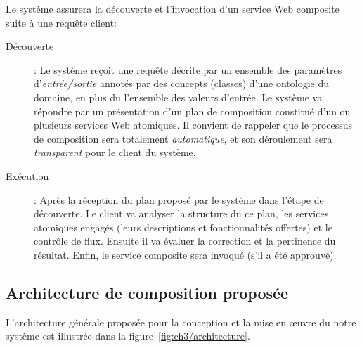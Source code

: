 Le système assurera la découverte et l'invocation d'un service Web
composite suite à une requête client:\medskip

\renewcommand{\descriptionlabel}[1]{\hspace{0.5cm}\textbullet~\textsf{#1}}
\begin{description}
\item [Découverte]: Le système reçoit une requête décrite par un
  ensemble des paramètres d'\emph{entrée/sortie} annotés par des
  concepts (classes) d'une ontologie du domaine, en plus du l'ensemble
  des valeurs d'entrée. Le système va répondre par un présentation
  d'un plan de composition constitué d'un ou plusieurs services Web
  atomiques. Il convient de rappeler que le processus de composition
  sera totalement \emph{automatique}, et son déroulement sera
  \emph{transparent} pour le client du système.

\item [Exécution]: Après la réception du plan proposé par le système
  dans l'étape de découverte. Le client va analyser la structure du ce
  plan, les services atomiques engagés (leurs descriptions et
  fonctionnalités offertes) et le contrôle de flux. Ensuite il va
  évaluer la correction et la pertinence du résultat. Enfin, le
  service composite sera invoqué (s'il a été approuvé).\medskip
\end{description}
\enddescription




\subsection{Architecture de composition proposée}
\label{sec:ch3/presentation-architecture}

L'architecture générale proposée pour la conception et la mise en
œuvre du notre système est illustrée dans la
figure~\ref{fig:ch3/architecture}.



